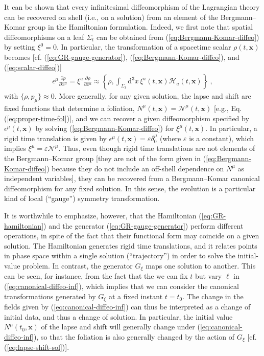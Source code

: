 \documentclass[12pt]{iopart}
\def\eq#1{\begin{equation}\begin{aligned}#1\end{aligned}\end{equation}}
\def\eref#1{(\ref{eq:#1})}
\def\D{\mathrm{d}}
\def\del#1#2{\frac{\partial#1}{\partial#2}}
\def\x{\mathbf{x}}
\begin{document}
It can be shown that every infinitesimal diffeomorphism of the Lagrangian theory can be recovered on shell (i.e., on a solution) from an element of the Bergmann--Komar group in the Hamiltonian formulation. Indeed, we first note that spatial diffeomorphisms on a leaf $\Sigma_t$ can be obtained from \eref{Bergmann-Komar-diffeo} by setting $\xi^0 = 0$. In particular, the transformation of a spacetime scalar $\rho(t,\x)$ becomes [cf. \eref{GR-gauge-generator}, \eref{Bergmann-Komar-diffeo}, and \eref{scalar-diffeo}]
\eq{\label{eq:scalar-3-diffeo}
\epsilon^{\mu}\del{\rho}{x^{\mu}} = \xi^a\del{\rho}{x^a} \approx \left\{\rho,\int_{\Sigma_t}\D^3x\,\xi^a(t,\x)\mathcal{H}_a(t,\x)\right\} \ ,
}
with $\{\rho,p_{\mu}\}\approx 0$. More generally, for any given solution, the lapse and shift are fixed functions that determine a foliation, $N^{\mu}(t,\x)=\mathcal{N}^{\mu}(t,\x)$ [e.g., Eq. \eref{proper-time-fol}], and we can recover a given diffeomorphism specified by $\epsilon^{\mu}(t,\x)$ by solving \eref{Bergmann-Komar-diffeo} for $\xi^{\mu}(t,\x)$. In particular, a rigid time translation is given by $\epsilon^{\mu}(t,\x)=\varepsilon\delta^{\mu}_0$ (where $\varepsilon$ is a constant), which implies $\xi^{\mu}=\varepsilon\mathcal{N}^{\mu}$. Thus, even though rigid time translations are not elements of the Bergmann--Komar group [they are not of the form given in \eref{Bergmann-Komar-diffeo} because they do not include an off-shell dependence on $N^{\mu}$ as independent variables], they can be recovered from a Bergmann--Komar canonical diffeomorphism for any fixed solution. In this sense, the evolution is a particular kind of local (``gauge'') symmetry transformation.

It is worthwhile to emphasize, however, that the Hamiltonian \eref{GR-hamiltonian} and the generator \eref{GR-gauge-generator} perform different operations, in spite of the fact that their functional form may coincide on a given solution. The Hamiltonian generates rigid time translations, and it relates points in phase space within a single solution (``trajectory'') in order to solve the initial-value problem. In contrast, the generator $G_{\xi}$ maps one solution to another. This can be seen, for instance, from the fact that the we can fix $t$ but vary $\ell$ in \eref{canonical-diffeo-inf}, which implies that we can consider the canonical transformations generated by $G_{\xi}$ at a fixed instant $t=t_0$. The change in the fields given by \eref{canonical-diffeo-inf} can thus be interpreted as a change of initial data, and thus a change of solution. In particular, the initial value $N^{\mu}(t_0,\x)$ of the lapse and shift will generally change under \eref{canonical-diffeo-inf}, so that the foliation is also generally changed by the action of $G_{\xi}$ [cf. \eref{lapse-shift-sol}].
\end{document}
